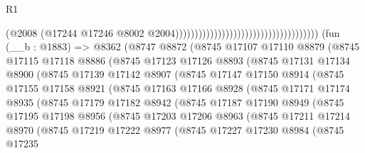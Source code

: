 \begin{lexlean}{R1}
\begin{coremodule}
                                                                          (@2008
                                                                            (@17244
                                                                              @17246
                                                                              @8002
                                                                              @2004)))))))))))))))))))))))))))))))))))))
    (fun (__b : @1883) =>
    @8362
      (@8747
        @8872
        (@8745
          @17107
          @17110
          @8879
          (@8745
            @17115
            @17118
            @8886
            (@8745
              @17123
              @17126
              @8893
              (@8745
                @17131
                @17134
                @8900
                (@8745
                  @17139
                  @17142
                  @8907
                  (@8745
                    @17147
                    @17150
                    @8914
                    (@8745
                      @17155
                      @17158
                      @8921
                      (@8745
                        @17163
                        @17166
                        @8928
                        (@8745
                          @17171
                          @17174
                          @8935
                          (@8745
                            @17179
                            @17182
                            @8942
                            (@8745
                              @17187
                              @17190
                              @8949
                              (@8745
                                @17195
                                @17198
                                @8956
                                (@8745
                                  @17203
                                  @17206
                                  @8963
                                  (@8745
                                    @17211
                                    @17214
                                    @8970
                                    (@8745
                                      @17219
                                      @17222
                                      @8977
                                      (@8745
                                        @17227
                                        @17230
                                        @8984
                                        (@8745
                                          @17235

\end{coremodule}
\end{lexlean}
